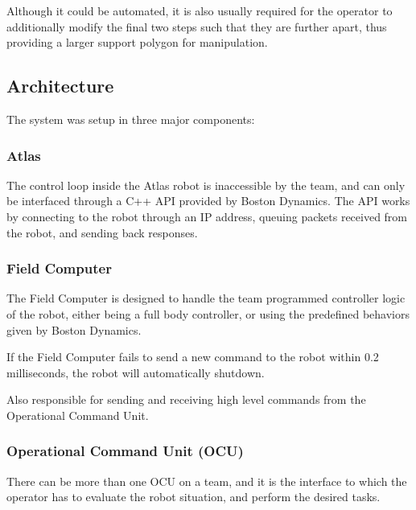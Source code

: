 \documentclass{article}
\begin{document}
Although it could be automated, it is also usually required for the operator to additionally modify the final two steps such that they are further apart, thus providing a larger support polygon for manipulation. 

\subsection{Architecture}

The system was setup in three major components: 

\subsubsection{Atlas}
The control loop inside the Atlas robot is inaccessible by the team, and can only be interfaced through a C++ API provided by Boston Dynamics. The API works by connecting to the robot through an IP address, queuing packets received from the robot, and sending back responses. 

\subsubsection{Field Computer}
The Field Computer is designed to handle the team programmed controller logic of the robot, either being a full body controller, or using the predefined behaviors given by Boston Dynamics. 

If the Field Computer fails to send a new command to the robot within 0.2 milliseconds, the robot will automatically shutdown. 

Also responsible for sending and receiving high level commands from the Operational Command Unit.


\subsubsection{Operational Command Unit (OCU)}


There can be more than one OCU on a team, and it is the interface to which the operator has to evaluate the robot situation, and perform the desired tasks. 

\end{document}
